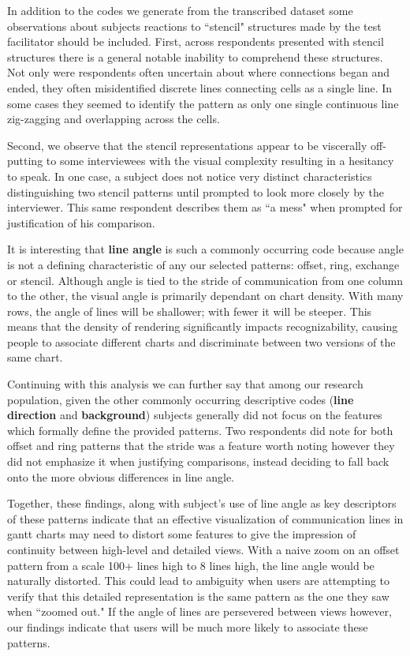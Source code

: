 In addition to the codes we generate from the transcribed dataset some observations about subjects reactions to ``stencil" structures made by the test facilitator should be included. First, across respondents presented with stencil structures there is a general notable inability to comprehend these structures. Not only were respondents often uncertain about where connections began and ended, they often misidentified discrete lines connecting cells as a single line. In some cases they seemed to identify the pattern as only one single continuous line zig-zagging and overlapping across the cells.

Second, we observe that the stencil representations appear to be viscerally off-putting to some interviewees with the visual complexity resulting in a hesitancy to speak. In one case, a subject does not notice very distinct characteristics distinguishing two stencil patterns until prompted to look more closely by the interviewer. This same respondent describes them as ``a mess" when prompted for justification of his comparison.

It is interesting that \textbf{line angle} is such a commonly occurring code because angle is not a defining characteristic of any our selected patterns: offset, ring, exchange or stencil. Although angle is tied to the stride of communication from one column to the other, the visual angle is primarily dependant on chart density. With many rows, the angle of lines will be shallower; with fewer it will be steeper. This means that the density of rendering significantly impacts recognizability, causing people to associate different charts and discriminate between two versions of the same chart.


Continuing with this analysis we can further say that among our research population, given the other commonly occurring descriptive codes (\textbf{line direction} and \textbf{background}) subjects generally did not focus on the features which formally define the provided patterns. Two respondents did note for both offset and ring patterns that the stride was a feature worth noting however they did not emphasize it when justifying comparisons, instead deciding to fall back onto the more obvious differences in line angle.

Together, these findings, along with subject's use of line angle as key descriptors of these patterns indicate that an effective visualization of communication lines in gantt charts may need to distort some features to give the impression of continuity between high-level and detailed views. With a naive zoom on an offset pattern from a scale 100+ lines high to 8 lines high, the line angle would be naturally distorted. This could lead to ambiguity when users are attempting to verify that this detailed representation is the same pattern as the one they saw when ``zoomed out." If the angle of lines are persevered between views however, our findings indicate that users will be much more likely to associate these patterns.

